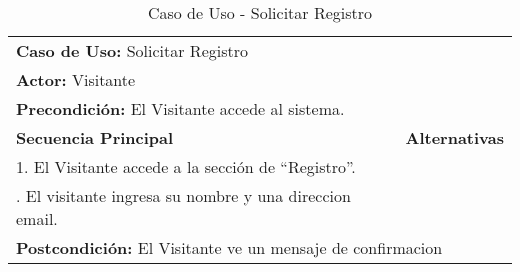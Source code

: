 \begin{table}[H]
  \begin{center}
    \begin{tabularx}{0.75\textwidth}{ X X  }
      \toprule
      \multicolumn{2}{l}{\textbf{Caso de Uso:} Solicitar Registro} \\
      \multicolumn{2}{l}{\textbf{Actor:} Visitante} \\
      \multicolumn{2}{l}{\textbf{Precondición:} El Visitante accede al sistema.} \\
      \addlinespace
      \textbf{Secuencia Principal} & \textbf{Alternativas} \\
      \midrule
      1. El Visitante accede a la sección de ``Registro''. \\
      \addlinespace
      2. El visitante ingresa su nombre y una direccion email.  \\

      \midrule
      \multicolumn{2}{l}{\textbf{Postcondición:} El Visitante ve un mensaje de confirmacion} \\

      \bottomrule
    \end{tabularx}
    \caption{Caso de Uso - Solicitar Registro}
    \label{tab:cu_solicitar_registro}
  \end{center}
\end{table}


